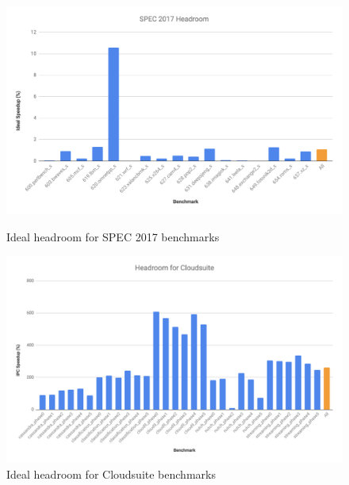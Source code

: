 \documentclass[conference]{IEEEtran}
\begin{document}
    \begin{figure}[h] %
        \centering
            \includegraphics[width=.95\textwidth]{spec2017_ideal.png}
        \caption{Ideal headroom for SPEC 2017 benchmarks}
        \vspace*{\floatsep}
        \vspace*{\floatsep}
            \includegraphics[width=.75\textwidth]{cloudsuite_ideal.png}
        \caption{Ideal headroom for Cloudsuite benchmarks}
    \end{figure}
    
\end{document}

